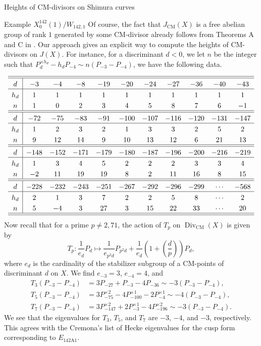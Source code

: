 \documentclass{amsart}
\theoremstyle{definition}
\def\JS#1#2{\left(\frac{#1}{#2}\right)}
\def\CM{\mathrm{CM}}
\def\Div{\operatorname{Div}}
\begin{document}
\begin{section}{Heights of CM-divisors on Shimura curves}
\begin{subsection}{Example $X_0^{142}(1)/W_{142,1}$}
Of course, the fact that $J_\CM(X)$ is a free abelian
group of rank $1$ generated by some CM-divisor already follows from
Theorems A and C in \cite{Zhang}. Our approach gives an explicit way to
compute the heights of CM-divisors on $J(X)$. For instance,
for a discriminant $d<0$, we let $n$ be the integer such that
$P_d^{\times h_d}-h_dP_{-4}\sim n(P_{-3}-P_{-4})$, we have the following data.

$$ \extrarowheight3pt
\begin{array}{c|cccccccccc} \hline\hline
 d & -3 & -4 & -8 & -19 & -20 & -24 & -27 & -36 & -40 & -43 \\ \hline
h_d&  1 &  1 &  1 &  1  &  1  &  1  &  1  &  1  &  1  &  1 \\
 n & 1  & 0  & 2  &  3  &  4  &  5  &  8  &  7  &  6  & -1 \\
 \hline\hline
 d & -72 & -75 & -83 & -91 & -100 & -107 & -116 & -120 & -131 & -147
 \\ \hline
h_d&  1  &  2  &  3  &  2  &   1  &   3  &   3  &   2  &   5  &  2 \\ 
 n &  9  & 12  &  14 &  9  &  10  &  13  &   12  &   6  &  21  &  13 \\
 \hline\hline
 d & -148 & -152 & -171 & -179 & -180 & -187 & -196 & -200 & -216 & -219  
 \\ \hline
h_d&  1   &   3  &   4  &   5  &   2  &   2  &   2  &   3  &   3  &  4 \\
 n &  -2  &  11   &  19  &  19  &   8  &   2  &  11 &  16  &   8  &  15
 \\ \hline\hline
 d & -228 & -232 & -243 & -251 & -267 & -292 & -296 & -299 & \cdots
   & -568 \\ \hline
h_d&   2  &   1  &   3  &   7  &   2  &   2  &   5  &   8  & \cdots &
2 \\
 n &   5  &  -4  &   3  &  27  &   3  &  15  &  22  &  33  & \cdots & 20
 \\ \hline\hline
\end{array}
$$
Now recall that for a prime $p\neq 2,71$, the action of $T_p$ on
$\Div_\CM(X)$ is given by
$$
  T_p:\frac1{e_d}P_d\longmapsto\frac1{e_{p^2d}}P_{p^2d}+\frac1{e_d}
  \left(1+\JS dp\right)P_d,
$$
where $e_d$ is the cardinality of the stabilizer subgroup of a
CM-points of discriminant $d$ on $X$. We find $e_{-3}=3$, $e_{-4}=4$,
and
\begin{equation*}
\begin{split}
  T_3(P_{-3}-P_{-4})&=3P_{-27}+P_{-3}-4P_{-36}\sim-3(P_{-3}-P_{-4}), \\
  T_5(P_{-3}-P_{-4})&=3P_{-75}^{\times 2}-4P_{-100}^{\times 1}
   -2P_{-4}^{\times 1}\sim-4(P_{-3}-P_{-4}), \\
  T_7(P_{-3}-P_{-4})&=3P_{-147}^{\times 2}+2P_{-3}^{\times 1}
   -4P_{-196}^{\times 2}\sim-3(P_{-3}-P_{-4}).
\end{split}
\end{equation*}
We see that the eigenvalues for $T_3$, $T_5$, and $T_7$ are $-3$,
$-4$, and $-3$, respectively. This agrees with the Cremona's list of
Hecke eigenvalues for the cusp form corresponding to
$E_{\text{142A1}}$.


\end{subsection}
\end{section}
\end{document}

